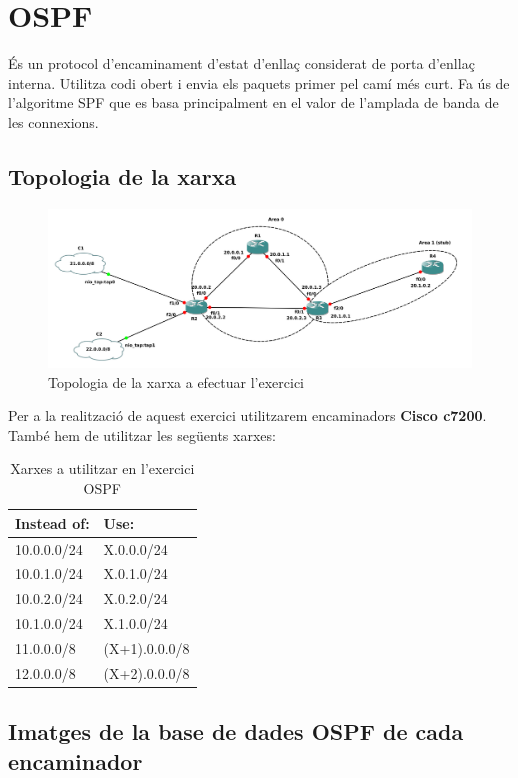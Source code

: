 \documentclass[10pt]{article}
\begin{document}
\section{OSPF}
És un protocol d'encaminament d'estat d'enllaç considerat de porta d'enllaç interna. Utilitza codi obert i envia els paquets primer pel camí més curt. Fa ús de l'algoritme SPF que es basa principalment en el valor de l'amplada de banda de les connexions.
\subsection{Topologia de la xarxa}
\begin{figure}[H]
\begin{center}
\includegraphics[scale=0.5]{Images/ospf.png}
\caption{Topologia de la xarxa a efectuar l'exercici}
\end{center}
\end{figure}
Per a la realització de aquest exercici utilitzarem encaminadors \textbf{Cisco c7200}. També hem de utilitzar les següents xarxes:
\begin{table}[h!]
\centering
\label{my-label}
\begin{tabular}{|l|l|}
\hline
Instead of: & Use:          \\ \hline
10.0.0.0/24 & X.0.0.0/24    \\ \hline
10.0.1.0/24 & X.0.1.0/24    \\ \hline
10.0.2.0/24 & X.0.2.0/24    \\ \hline
10.1.0.0/24 & X.1.0.0/24    \\ \hline
11.0.0.0/8  & (X+1).0.0.0/8 \\ \hline
12.0.0.0/8  & (X+2).0.0.0/8 \\ \hline
\end{tabular}
\caption{Xarxes a utilitzar en l'exercici OSPF}
\end{table}
\subsection{Imatges de la base de dades OSPF de cada encaminador}
\end{document}
